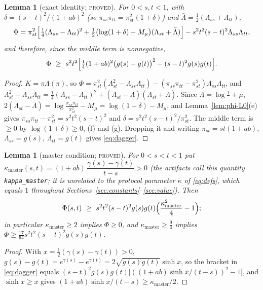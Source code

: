 \documentclass[11pt]{article}
\theoremstyle{plain}
\newtheorem{lemma}[theorem]{Lemma}
\theoremstyle{definition}
\theoremstyle{remark}
\newcommand{\Lam}{\Lambda}
\newcommand{\lbl}[1]{\textsc{#1}}
\begin{document}
\begin{lemma}[exact identity; \lbl{proved}]\label{lem:phi-L1}
For $0<s,t<1$, with $\delta=(s-t)^2/(1+ab)^2$ (so $\pi_{ss}\pi_{tt}=\pi_{st}^2(1+\delta)$) and
$\bar\Lam=\tfrac12(\Lam_{ss}+\Lam_{tt})$,
\[
  \Phi=\pi_{st}^2\Bigl[\tfrac14(\Lam_{ss}-\Lam_{tt})^2
  +\tfrac12\bigl(\log(1+\delta)-M_\mu\bigr)(\Lam_{st}+\bar\Lam)\Bigr]
  -s^2t^2(s-t)^2\Lam_{ss}\Lam_{tt},
\]
and therefore, since the middle term is nonnegative,
\begin{equation}\label{eq:dagger}
  \Phi\ \ge\ s^2t^2\Bigl[\tfrac14(1+ab)^2\bigl(g(s)-g(t)\bigr)^2-(s-t)^2g(s)g(t)\Bigr].
\end{equation}
\end{lemma}
\begin{proof}
$K=\pi\Lam(\pi)$, so $\Phi=\pi_{st}^2(\Lam_{st}^2-\Lam_{ss}\Lam_{tt})
-(\pi_{ss}\pi_{tt}-\pi_{st}^2)\Lam_{ss}\Lam_{tt}$, and
$\Lam_{st}^2-\Lam_{ss}\Lam_{tt}=\tfrac14(\Lam_{ss}-\Lam_{tt})^2+(\Lam_{st}-\bar\Lam)(\Lam_{st}+\bar\Lam)$.
Since $\Lam=\log\frac1\cdot+\mu$,
$2(\Lam_{st}-\bar\Lam)=\log\frac{\pi_{ss}\pi_{tt}}{\pi_{st}^2}-M_\mu=\log(1+\delta)-M_\mu$,
and Lemma~\ref{lem:phi-L0}(e) gives $\pi_{ss}\pi_{tt}-\pi_{st}^2=s^2t^2(s-t)^2$
and $\delta=s^2t^2(s-t)^2/\pi_{st}^2$.  The middle term is $\ge0$ by
$\log(1+\delta)\ge0$, (f) and (g).  Dropping it and writing
$\pi_{st}=st(1+ab)$, $\Lam_{ss}=g(s)$, $\Lam_{tt}=g(t)$ gives
\eqref{eq:dagger}.
\end{proof}

\begin{lemma}[master condition; \lbl{proved}]\label{lem:phi-L2}
For $0<s<t<1$ put $\kappa_{\mathrm{master}}(s,t)=(1+ab)\,\dfrac{\gamma(s)-\gamma(t)}{t-s}>0$
(the artifacts call this quantity \texttt{kappa\_master}; it is unrelated to the
protocol parameter $\kappa$ of \eqref{eq:defs}, which equals $1$ throughout
Sections~\ref{sec:constants}--\ref{sec:value}).  Then
\[
  \Phi(s,t)\ \ge\ s^2t^2(s-t)^2g(s)g(t)\Bigl(\frac{\kappa_{\mathrm{master}}^2}4-1\Bigr);
\]
in particular $\kappa_{\mathrm{master}}\ge2$ implies $\Phi\ge0$, and $\kappa_{\mathrm{master}}\ge\tfrac94$ implies
$\Phi\ge\tfrac{17}{64}s^2t^2(s-t)^2g(s)g(t)$.
\end{lemma}
\begin{proof}
With $x=\tfrac12(\gamma(s)-\gamma(t))>0$, $g(s)-g(t)=e^{\gamma(s)}-e^{\gamma(t)}
=2\sqrt{g(s)g(t)}\sinh x$, so the bracket in \eqref{eq:dagger} equals
$(s-t)^2g(s)g(t)\bigl[((1+ab)\sinh x/(t-s))^2-1\bigr]$, and $\sinh x\ge x$
gives $(1+ab)\sinh x/(t-s)\ge\kappa_{\mathrm{master}}/2$.
\end{proof}
\end{document}
